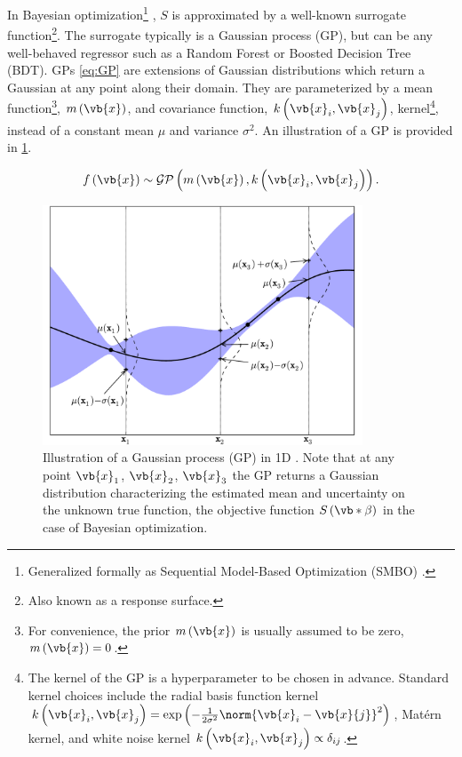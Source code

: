In Bayesian optimization\footnote{Generalized
formally as Sequential Model-Based Optimization (SMBO) \cite{NIPS2011_4443}.} \cite{Brochu2010,1301.1942,Borisyak,NIPS2011_4443},
$S$ is approximated by a well-known surrogate function\footnote{Also known as a response surface.}.
The surrogate typically is a Gaussian process (GP),
but can be any well-behaved regressor such as
a Random Forest or Boosted Decision Tree (BDT).
GPs \cref{eq:GP} are
extensions of Gaussian distributions which return a Gaussian at any point along their domain.
They are parameterized by a mean function\footnote{For convenience,
the prior $m\left(\vb{x}\right)$ is usually assumed to be zero, $m\left(\vb{x}\right)=0$.}, $m\left(\vb{x}\right)$,
and covariance function, $k\left(\vb{x}_{i}, \vb{x}_{j}\right)$,
\ie kernel\footnote{The kernel of the GP is a hyperparameter to be chosen in advance.
Standard kernel choices include
the radial basis function kernel $k\left(\vb{x}_{i}, \vb{x}_{j}\right) = \exp\left(-\frac{1}{2\sigma^{2}}\norm{\vb{x}_{i}-\vb{x}{j}}^{2}\right)$,
Mat\'{e}rn kernel,
and white noise kernel $k\left(\vb{x}_{i}, \vb{x}_{j}\right) \propto \delta_{ij}$.},
instead of a constant mean $\mu$ and variance $\sigma^{2}$.
An illustration of a GP is provided in \cref{fig:GP_ex}.

\begin{equation}\label{eq:GP}
f\left(\vb{x}\right) \sim \mathcal{GP}\left(m\left(\vb{x}\right), k\left(\vb{x}_{i}, \vb{x}_{j}\right)\right).
\end{equation}

\begin{figure}[H] %
\centering
\includegraphics[width=0.85\textwidth]{figures/ml/gp}
\caption{
Illustration of a Gaussian process (GP) in 1D \cite{Brochu2010}.
Note that at any point $\vb{x}_{1}$, $\vb{x}_{2}$, $\vb{x}_{3}$ the GP
returns a Gaussian distribution characterizing the estimated mean and uncertainty on the
unknown true function, \ie the objective function $S\left(\vb*{\beta}\right)$ in the case of Bayesian optimization.
}
\label{fig:GP_ex}
\end{figure}

